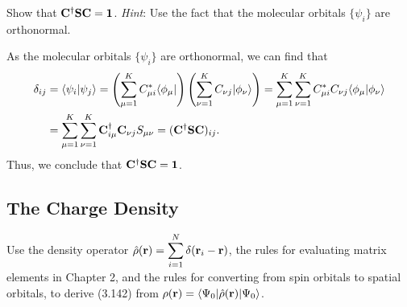 \documentclass[a4paper]{book}
\newcounter{exercise}[chapter]
\newcounter{solution}[chapter]
\newcommand{\C}{{\bf C}}
\newcommand{\I}{{\bf 1}}
\newcommand{\SSS}{{\bf S}}
\newcommand{\bfr}{{\bf r}}
\begin{document}
	\begin{exercise}
	Show that $\C^\dagger \SSS \C = \I$. {\it Hint}: Use the fact that the molecular orbitals $\{ \psi_i \}$ are orthonormal.
	\end{exercise}
	
	\begin{solution}
	
	As the molecular orbitals $\{ \psi_i \}$ are orthonormal, we can find that
	\begin{align*}
		\delta_{ij} &= \langle \psi_i | \psi_j \rangle = \left( \sum_{\mu=1}^K C^*_{\mu i} \langle \phi_\mu | \right) \left( \sum_{\nu=1}^K C_{\nu j} | \phi_\nu \rangle \right) = \sum_{\mu=1}^K \sum_{\nu=1}^K C^*_{\mu i} C_{\nu j} \langle \phi_\mu | \phi_\nu \rangle \\
		&= \sum_{\mu=1}^K \sum_{\nu=1}^K \C^\dagger_{i \mu} \C_{\nu j} S_{\mu \nu} = ( \C^\dagger \SSS \C )_{ij} .
	\end{align*}
	Thus, we conclude that $\C^\dagger \SSS \C = \I$.
	
	\end{solution}
	
	\subsection{The Charge Density}
	
	\begin{exercise}
	Use the density operator $\displaystyle \hat{\rho}( \bfr ) = \sum_{i=1}^N \delta( \bfr_i - \bfr )$, the rules for evaluating matrix elements in Chapter 2, and the rules for converting from spin orbitals to spatial orbitals, to derive (3.142) from $\rho( \bfr ) = \langle \Psi_0 | \hat{\rho}( \bfr ) | \Psi_0 \rangle$.
	\end{exercise}
	
\end{document}

